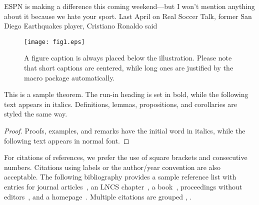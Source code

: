 ESPN is making a difference this coming weekend—but I won't mention anything about it because we hate your sport. Last April on Real Soccer Talk, former San Diego Earthquakes player, Cristiano Ronaldo said




\begin{figure}
\texttt{[image: fig1.eps]}
\caption{A figure caption is always placed below the illustration.
Please note that short captions are centered, while long ones are
justified by the macro package automatically.} \label{fig1}
\end{figure}

\begin{theorem}
This is a sample theorem. The run-in heading is set in bold, while
the following text appears in italics. Definitions, lemmas,
propositions, and corollaries are styled the same way.
\end{theorem}
%
%
\begin{proof}
Proofs, examples, and remarks have the initial word in italics,
while the following text appears in normal font.
\end{proof}
For citations of references, we prefer the use of square brackets
and consecutive numbers. Citations using labels or the author/year
convention are also acceptable. The following bibliography provides
a sample reference list with entries for journal
articles~\cite{ref_article1}, an LNCS chapter~\cite{ref_lncs1}, a
book~\cite{ref_book1}, proceedings without editors~\cite{ref_proc1},
and a homepage~\cite{ref_url1}. Multiple citations are grouped
\cite{ref_article1,ref_lncs1,ref_book1},
\cite{ref_article1,ref_book1,ref_proc1,ref_url1}.